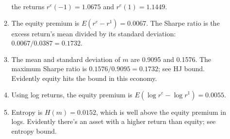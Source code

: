 \documentclass[11pt]{article}
\begin{document}
\begin{enumerate}
\begin{enumerate}
the returns $r^e(-1) =   1.0675 $ and $ r^e(1) =  1.1449 $.
\item The equity premium is $ E(r^e-r^1) =  0.0067$.
The Sharpe ratio is the excess return's mean divided by its standard deviation:
$ 0.0067/0.0387 = 0.1732$.
\item The mean and standard deviation of $m$ are 0.9095 and 0.1576.
The maximum Sharpe ratio is $ 0.1576 /0.9095 = 0.1732$; see HJ bound.
Evidently equity hits the bound in this economy.
\item Using log returns, the equity premium is
$ E(\log r^e- \log r^1) =  0.0055$.
\item Entropy is $H(m) = 0.0152$,
which is well above the equity premium in logs.
Evidently there's an asset with a higher return than equity;
see entropy bound.
\end{enumerate}


\end{enumerate}
\end{document}
